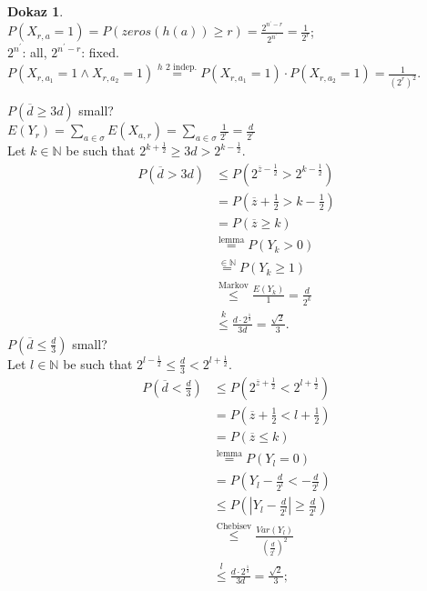 \documentclass[a4paper, 12pt]{book}
\theoremstyle{definition}
\newtheorem{pro}[counter]{Dokaz}
\theoremstyle{remark}
\newcommand{\N}{\mathbb{N}}
\begin{document}
\begin{pro} \text{} \\
  $P(X_{r, a} = 1) = P(zeros(h(a)) \geq r) = \frac{2^{n^{'}-r}}{2^{n^{'}}} = \frac{1}{2^r}$; \\
  $2^{n^{'}}$: all, $2^{n^{'}-r}$: fixed. \\
  $P(X_{r, a_1} = 1 \land X_{r, a_2} = 1) \stackrel{h \text{ 2 indep.}}{=}
  P(X_{r, a_1} = 1) \cdot P(X_{r, a_2} = 1) = \frac{1}{\left(2^r\right)^2}$.
\end{pro}
$P(\overline{d} \geq 3d)$ small? \\
$E(Y_r) = \sum_{a \in \sigma} E(X_{a, r}) = \sum_{a \in \sigma} \frac{1}{2^r} = \frac{d}{2^r}$ \\
Let $k \in \N$ be such that $2^{k + \frac{1}{2}} \geq 3d > 2^{k - \frac{1}{2}}$.
\begin{align*}
  P(\overline{d} > 3d) &\leq P(2^{\overline{z} - \frac{1}{2}} > 2^{k - \frac{1}{2}}) \\
  &= P(\overline{z} + \frac{1}{2} > k - \frac{1}{2}) \\
  &= P(\overline{z} \geq k) \\
  &\stackrel{\text{lemma}}{=} P(Y_k > 0) \\
  &\stackrel{\in \N}{=} P(Y_k \geq 1) \\
  &\stackrel{\text{Markov}}{\leq} \frac{E(Y_k)}{1} = \frac{d}{2^k} \\
  &\stackrel{k}{\leq} \frac{d \cdot 2^{\frac{1}{3}}}{3d} = \frac{\sqrt{2}}{3}.
\end{align*}
$P(\overline{d} \leq \frac{d}{3})$ small? \\
Let $l \in \N$ be such that $2^{l - \frac{1}{2}} \leq \frac{d}{3} < 2^{l + \frac{1}{2}}$.
\begin{align*}
  P(\overline{d} < \frac{d}{3}) &\leq P(2^{\overline{z} + \frac{1}{2}} < 2^{l + \frac{1}{2}}) \\
  &= P(\overline{z} + \frac{1}{2} < l + \frac{1}{2}) \\
  &= P(\overline{z} \leq k) \\
  &\stackrel{\text{lemma}}{=} P(Y_l = 0) \\
  &= P(Y_l - \frac{d}{2^l} < -\frac{d}{2^l}) \\
  &\leq P(|Y_l - \frac{d}{2^l}| \geq \frac{d}{2^l}) \\
  &\stackrel{\text{Chebisev}}{\leq} \frac{Var(Y_l)}{\left(\frac{d}{2^l}\right)^2} \\
  &\stackrel{l}{\leq} \frac{d \cdot 2^{\frac{1}{3}}}{3d} = \frac{\sqrt{2}}{3};
\end{align*}
\end{document}
